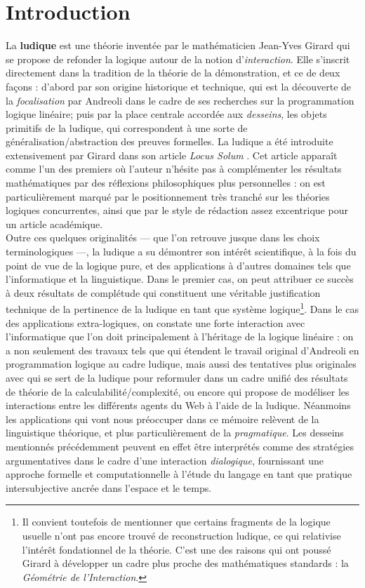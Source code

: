 \documentclass[12pt]{report}
\begin{document}
\chapter*{Introduction}

La \textbf{ludique} est une théorie inventée par le mathématicien Jean-Yves Girard qui se propose de refonder la logique autour de la notion d'\emph{interaction}. Elle s'inscrit directement dans la tradition de la théorie de la démonstration, et ce de deux façons : d'abord par son origine historique et technique, qui est la découverte de la \emph{focalisation} par Andreoli \cite{And92} dans le cadre de ses recherches sur la programmation logique linéaire; puis par la place centrale accordée aux \emph{desseins}, les objets primitifs de la ludique, qui correspondent à une sorte de généralisation/abstraction des preuves formelles. La ludique a été introduite extensivement par Girard dans son article \textit{Locus Solum} \cite{Gir01}. Cet article apparaît comme l'un des premiers où l'auteur n'hésite pas à complémenter les résultats mathématiques par des réflexions philosophiques plus personnelles : on est particulièrement marqué par le positionnement très tranché sur les théories logiques concurrentes, ainsi que par le style de rédaction assez excentrique pour un article académique.\\

Outre ces quelques originalités --- que l'on retrouve jusque dans les choix terminologiques ---, la ludique a su démontrer son intérêt scientifique, à la fois du point de vue de la logique pure, et des applications à d'autres domaines tels que l'informatique et la linguistique. Dans le premier cas, on peut attribuer ce succès à deux résultats de complétude qui constituent une véritable justification technique de la pertinence de la ludique en tant que système logique\footnote{Il convient toutefois de mentionner que certains fragments de la logique usuelle n'ont pas encore trouvé de reconstruction ludique, ce qui relativise l'intérêt fondationnel de la théorie. C'est une des raisons qui ont poussé Girard à développer un cadre plus proche des mathématiques standards : la \textit{Géométrie de l'Interaction}.}. Dans le cas des applications extra-logiques, on constate une forte interaction avec l'informatique que l'on doit principalement à l'héritage de la logique linéaire : on a non seulement des travaux tels que \cite{Sau08} qui étendent le travail original d'Andreoli en programmation logique au cadre ludique, mais aussi des tentatives plus originales avec \cite{Ter11} qui se sert de la ludique pour reformuler dans un cadre unifié des résultats de théorie de la calculabilité/complexité, ou encore \cite{Fou11} qui propose de modéliser les interactions entre les différents agents du Web à l'aide de la ludique. Néanmoins les applications qui vont nous préoccuper dans ce mémoire relèvent de la linguistique théorique, et plus particulièrement de la \emph{pragmatique}. Les desseins mentionnés précédemment peuvent en effet être interprétés comme des stratégies argumentatives dans le cadre d'une interaction \emph{dialogique}, fournissant une approche formelle et computationnelle à l'étude du langage en tant que pratique intersubjective ancrée dans l'espace et le temps.\\
\end{document}
